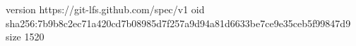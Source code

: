 version https://git-lfs.github.com/spec/v1
oid sha256:7b9b8c2ec71a420cd7b08985d7f257a9d94a81d6633be7ce9e35ceb5f99847d9
size 1520
